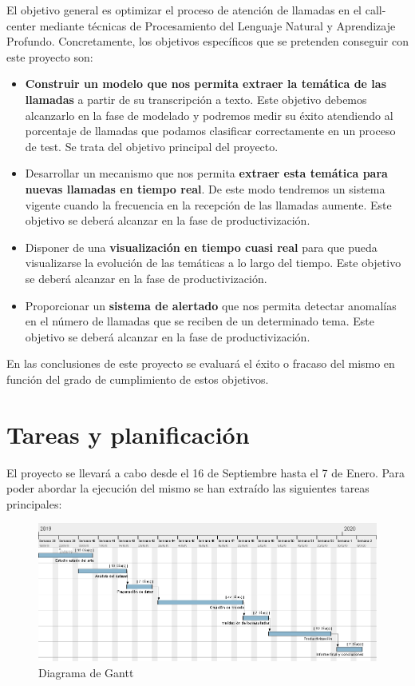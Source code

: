 El objetivo general es optimizar el proceso de atención de llamadas en el call-center mediante técnicas de Procesamiento del Lenguaje Natural y Aprendizaje Profundo. Concretamente, los objetivos específicos que se pretenden conseguir con este proyecto son: 

\begin{itemize}
	\item \textbf{Construir un modelo que nos permita extraer la temática de las llamadas} a partir de su transcripción a texto. Este objetivo debemos alcanzarlo en la fase de modelado y podremos medir su éxito atendiendo al porcentaje de llamadas que podamos clasificar correctamente en un proceso de test. Se trata del objetivo principal del proyecto.
	\item Desarrollar un mecanismo que nos permita \textbf{extraer esta temática para nuevas llamadas en tiempo real}. De este modo tendremos un sistema vigente cuando la frecuencia en la recepción de las llamadas aumente. Este objetivo se deberá alcanzar en la fase de productivización. 
	\item Disponer de una\textbf{ visualización en tiempo cuasi real} para que pueda visualizarse la evolución de las temáticas a lo largo del tiempo. Este objetivo se deberá alcanzar en la fase de productivización. 
	\item Proporcionar un \textbf{sistema de alertado} que nos permita detectar anomalías en el número de llamadas que se reciben de un determinado tema. Este objetivo se deberá alcanzar en la fase de productivización.
\end{itemize}

En las conclusiones de este proyecto se evaluará el éxito o fracaso del mismo en función del grado de cumplimiento de estos objetivos.

\section{Tareas y planificación}
\label{section:intro:planificacion}
El proyecto se llevará a cabo desde el 16 de Septiembre hasta el 7 de Enero. Para poder abordar la ejecución del  mismo se han extraído las siguientes tareas principales: 


\begin{figure}[!ht]
	\centering
	\includegraphics[width=\textwidth]{images/intro/gantt}
	\caption{Diagrama de Gantt}
	\label{fig:gantt}
\end{figure}


